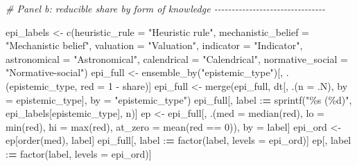 \documentclass[
  11pt,
]{article}
\newenvironment{Shaded}{\begin{snugshade}}{\end{snugshade}}
\newcommand{\AttributeTok}[1]{\textcolor[rgb]{0.77,0.63,0.00}{#1}}
\newcommand{\CommentTok}[1]{\textcolor[rgb]{0.56,0.35,0.01}{\textit{#1}}}
\newcommand{\DecValTok}[1]{\textcolor[rgb]{0.00,0.00,0.81}{#1}}
\newcommand{\ErrorTok}[1]{\textcolor[rgb]{0.64,0.00,0.00}{\textbf{#1}}}
\newcommand{\FunctionTok}[1]{\textcolor[rgb]{0.00,0.00,0.00}{#1}}
\newcommand{\NormalTok}[1]{#1}
\newcommand{\OtherTok}[1]{\textcolor[rgb]{0.56,0.35,0.01}{#1}}
\newcommand{\SpecialCharTok}[1]{\textcolor[rgb]{0.00,0.00,0.00}{#1}}
\newcommand{\StringTok}[1]{\textcolor[rgb]{0.31,0.60,0.02}{#1}}
\begin{document}
\begin{Shaded}
\begin{Highlighting}[]
\CommentTok{\# Panel b: reducible share by form of knowledge {-}{-}{-}{-}{-}{-}{-}{-}{-}{-}{-}{-}{-}{-}{-}{-}{-}{-}{-}{-}{-}{-}{-}{-}{-}{-}{-}{-}{-}{-}{-}{-}}

\NormalTok{epi\_labels }\OtherTok{\textless{}{-}} \FunctionTok{c}\NormalTok{(}\AttributeTok{heuristic\_rule =} \StringTok{"Heuristic rule"}\NormalTok{,}
                \AttributeTok{mechanistic\_belief =} \StringTok{"Mechanistic belief"}\NormalTok{,}
                \AttributeTok{valuation =} \StringTok{"Valuation"}\NormalTok{, }\AttributeTok{indicator =} \StringTok{"Indicator"}\NormalTok{,}
                \AttributeTok{astronomical =} \StringTok{"Astronomical"}\NormalTok{, }\AttributeTok{calendrical =} \StringTok{"Calendrical"}\NormalTok{,}
                \AttributeTok{normative\_social =} \StringTok{"Normative{-}social"}\NormalTok{)}
\NormalTok{epi\_full }\OtherTok{\textless{}{-}} \FunctionTok{ensemble\_by}\NormalTok{(}\StringTok{"epistemic\_type"}\NormalTok{)[, .(epistemic\_type, }\AttributeTok{red =} \DecValTok{1} \SpecialCharTok{{-}}\NormalTok{ share)]}
\NormalTok{epi\_full }\OtherTok{\textless{}{-}} \FunctionTok{merge}\NormalTok{(epi\_full, dt[, .(}\AttributeTok{n =}\NormalTok{ .N), }\AttributeTok{by =}\NormalTok{ epistemic\_type],}
                  \AttributeTok{by =} \StringTok{"epistemic\_type"}\NormalTok{)}
\NormalTok{epi\_full[, label }\SpecialCharTok{:}\ErrorTok{=} \FunctionTok{sprintf}\NormalTok{(}\StringTok{"\%s (\%d)"}\NormalTok{, epi\_labels[epistemic\_type], n)]}
\NormalTok{ep }\OtherTok{\textless{}{-}}\NormalTok{ epi\_full[, .(}\AttributeTok{med =} \FunctionTok{median}\NormalTok{(red), }\AttributeTok{lo =} \FunctionTok{min}\NormalTok{(red), }\AttributeTok{hi =} \FunctionTok{max}\NormalTok{(red),}
                   \AttributeTok{at\_zero =} \FunctionTok{mean}\NormalTok{(red }\SpecialCharTok{==} \DecValTok{0}\NormalTok{)), by }\OtherTok{=}\NormalTok{ label]}
\NormalTok{epi\_ord }\OtherTok{\textless{}{-}}\NormalTok{ ep[}\FunctionTok{order}\NormalTok{(med), label]}
\NormalTok{epi\_full[, label }\SpecialCharTok{:}\ErrorTok{=} \FunctionTok{factor}\NormalTok{(label, }\AttributeTok{levels =}\NormalTok{ epi\_ord)]}
\NormalTok{ep[, label }\SpecialCharTok{:}\ErrorTok{=} \FunctionTok{factor}\NormalTok{(label, }\AttributeTok{levels =}\NormalTok{ epi\_ord)]}


\end{Highlighting}
\end{Shaded}
\end{document}
